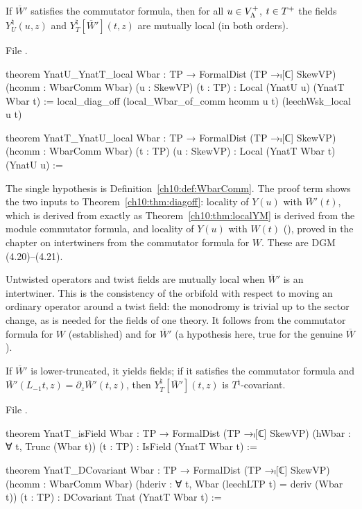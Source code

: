 \begin{theorem}\label{ch10:thm:pt}
If $\overline W'$ satisfies the commutator formula, then for all $u\in V_{\Lambda}^{+}$, $t\in T^{+}$ the
fields $Y^\natural_U(u,z)$ and $Y^\natural_T[\overline W'](t,z)$ are mutually local (in both
orders).
\end{theorem}
\noindent File .
\begin{leancode}
theorem YnatU_YnatT_local {Wbar : TP → FormalDist (TP →ₗ[ℂ] SkewVP)} (hcomm : WbarComm Wbar)
    (u : SkewVP) (t : TP) : Local (YnatU u) (YnatT Wbar t) :=
  local_diag_off (local_Wbar_of_comm hcomm u t) (leechWsk_local u t)

theorem YnatT_YnatU_local {Wbar : TP → FormalDist (TP →ₗ[ℂ] SkewVP)} (hcomm : WbarComm Wbar)
    (t : TP) (u : SkewVP) : Local (YnatT Wbar t) (YnatU u) :=
\end{leancode}
\begin{dictionary}
The single hypothesis  is Definition~\ref{ch10:def:WbarComm}.  The proof term shows
the two inputs to Theorem~\ref{ch10:thm:diagoff}: locality of $Y(u)$ with $\overline W'(t)$, which
is derived from  exactly as Theorem~\ref{ch10:thm:localYM} is derived from the module
commutator formula, and locality of $Y(u)$ with $W(t)$ (), proved in the
chapter on intertwiners from the commutator formula for $W$.  These are DGM (4.20)--(4.21).
\end{dictionary}

\begin{physics}
Untwisted operators and twist fields are mutually local when $\overline W'$ is an intertwiner. This is the consistency of the orbifold with respect to moving an ordinary operator around a twist field: the monodromy is trivial up to the sector change, as is needed for the fields of one theory. It follows from the commutator formula for $W$ (established) and for $\overline W'$ (a hypothesis here, true for the genuine $\overline W$).
\end{physics}

\begin{proposition}\label{ch10:prop:YnatTcov}
If $\overline W'$ is lower-truncated, it yields fields; if it satisfies the commutator formula and
$\overline W'(L_{-1}t,z)=\partial_z\overline W'(t,z)$, then $Y^\natural_T[\overline W'](t,z)$ is
$T^\natural$-covariant.
\end{proposition}
\noindent File .
\begin{leancode}
theorem YnatT_isField {Wbar : TP → FormalDist (TP →ₗ[ℂ] SkewVP)} (hWbar : ∀ t, Trunc (Wbar t))
    (t : TP) : IsField (YnatT Wbar t) :=

theorem YnatT_DCovariant {Wbar : TP → FormalDist (TP →ₗ[ℂ] SkewVP)} (hcomm : WbarComm Wbar)
    (hderiv : ∀ t, Wbar (leechLTP t) = deriv (Wbar t)) (t : TP) :
    DCovariant Tnat (YnatT Wbar t) :=
\end{leancode}

